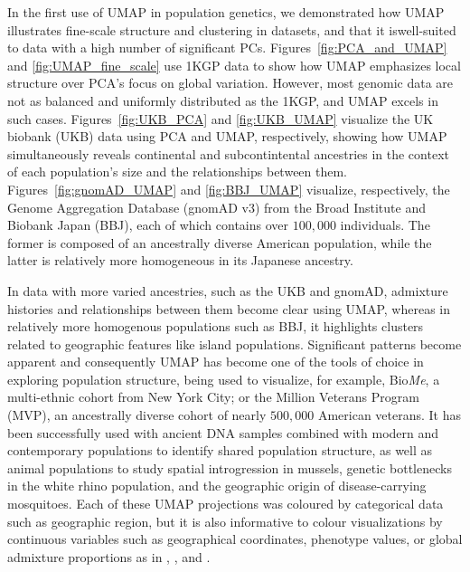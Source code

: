 \documentclass[12pt]{article}
\begin{document}
In the first use of UMAP in population genetics, we demonstrated how UMAP illustrates fine-scale structure and clustering in datasets, and that it iswell-suited to data with a high number of significant PCs\cite{diaz-papkovich_umap_2019}.  Figures~\ref{fig:PCA_and_UMAP} and \ref{fig:UMAP_fine_scale} use 1KGP data to show how UMAP emphasizes local structure over PCA's focus on global variation. However, most genomic data are not as balanced and uniformly distributed as the 1KGP, and UMAP excels in such cases. Figures~\ref{fig:UKB_PCA} and \ref{fig:UKB_UMAP} visualize the UK biobank (UKB)\cite{sudlow2015uk} data using PCA and UMAP, respectively, showing how UMAP simultaneously reveals continental and subcontintental ancestries in the context of each population's size and the relationships between them. Figures~\ref{fig:gnomAD_UMAP} and \ref{fig:BBJ_UMAP} visualize, respectively, the Genome Aggregation Database (gnomAD v3) from the Broad Institute\cite{karczewski_mutational_2020} and Biobank Japan (BBJ)\cite{nagai2017overview}\cite{sakaue_dimensionality_2020}, each of which contains over $100,000$ individuals. The former is composed of an ancestrally diverse American population, while the latter is relatively more homogeneous in its Japanese ancestry.

In data with more varied ancestries, such as the UKB and gnomAD, admixture histories and relationships between them become clear using UMAP, whereas in relatively more homogenous populations such as BBJ, it highlights clusters related to geographic features like island populations. Significant patterns become apparent and consequently UMAP has become one of the tools of choice in exploring population structure, being used to visualize, for example, Bio\textit{Me}, a multi-ethnic cohort from New York City\cite{belbin_towards_2019}; or the Million Veterans Program (MVP), an ancestrally diverse cohort of nearly $500,000$ American veterans\cite{hunter-zinck_genotyping_2020}. It has been successfully used with ancient DNA samples combined with modern and contemporary populations to identify shared population structure\cite{margaryan_population_2019}, as well as animal populations to study spatial introgression in mussels\cite{simon_local_2019}, genetic bottlenecks in the white rhino population\cite{sanchez-barreiro_historical_2020}, and the geographic origin of disease-carrying mosquitoes\cite{consortium_genome_2020}\cite{schmidt_population_2020}. Each of these UMAP projections was coloured by categorical data such as geographic region, but it is also informative to colour visualizations by continuous variables such as geographical coordinates, phenotype values, or global admixture proportions as in \cite{diaz-papkovich_umap_2019}, \cite{dai_population_2020}, and \cite{spear2020recent}.
\end{document}
